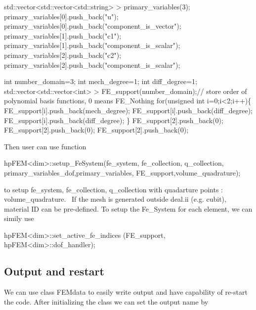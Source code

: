 \begin{DoxyCode}
std::vector<std::vector<std::string> > primary\_variables(3);        
primary\_variables[0].push\_back(\textcolor{stringliteral}{"u"}); primary\_variables[0].push\_back(\textcolor{stringliteral}{"component\_is\_vector"});
primary\_variables[1].push\_back(\textcolor{stringliteral}{"c1"}); primary\_variables[1].push\_back(\textcolor{stringliteral}{"component\_is\_scalar"});
primary\_variables[2].push\_back(\textcolor{stringliteral}{"c2"}); primary\_variables[2].push\_back(\textcolor{stringliteral}{"component\_is\_scalar"});

\textcolor{keywordtype}{int} number\_domain=3;
\textcolor{keywordtype}{int} mech\_degree=1;
\textcolor{keywordtype}{int} diff\_degree=1;
std::vector<std::vector<int> > FE\_support(number\_domain);\textcolor{comment}{// store order of polynomial basis functions, 0
       means FE\_Nothing   }
\textcolor{keywordflow}{for}(\textcolor{keywordtype}{unsigned} \textcolor{keywordtype}{int} i=0;i<2;i++)\{
    FE\_support[i].push\_back(mech\_degree);
    FE\_support[i].push\_back(diff\_degree);
    FE\_support[i].push\_back(diff\_degree);
\}
FE\_support[2].push\_back(0);
FE\_support[2].push\_back(0);
FE\_support[2].push\_back(0);
\end{DoxyCode}
 Then user can use function 
\begin{DoxyCode}
hpFEM<dim>::setup_FeSystem(fe\_system, fe\_collection, q\_collection, primary\_variables\_dof,primary\_variables,
      FE\_support,volume\_quadrature);
\end{DoxyCode}
 to setup {\ttfamily fe\+\_\+system}, {\ttfamily fe\+\_\+collection}, {\ttfamily q\+\_\+collection} with quadarture points \+: {\ttfamily volume\+\_\+quadrature}.~\newline
 If the mesh is generated outside deal.\+ii (e.\+g. cubit), material ID can be pre-\/defined. To setup the {\ttfamily Fe\+\_\+\+System} for each element, we can simily use 
\begin{DoxyCode}
hpFEM<dim>::set_active_fe_indices (FE\_support, hpFEM<dim>::dof_handler);
\end{DoxyCode}
 \hypertarget{_intercalation_outPut}{}\subsection{Output and restart}\label{_intercalation_outPut}
We can use class {\ttfamily F\+E\+Mdata} to easily write output and have capability of re-\/start the code. After initializing the class we can set the output name by 
